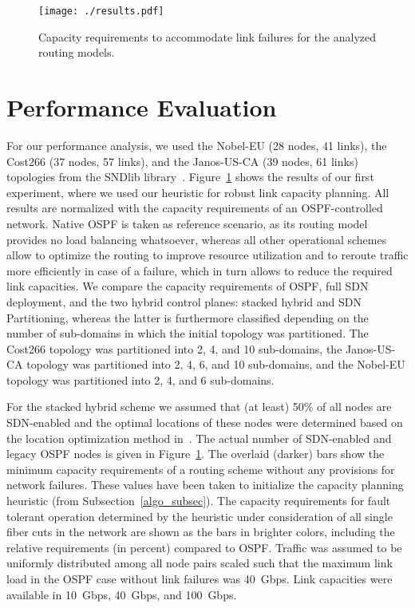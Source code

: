 \documentclass[10pt, conference]{IEEEtran}
\begin{document}
\begin{figure}[t] \center
\texttt{[image: ./results.pdf]}
\caption{Capacity requirements to accommodate link failures for the analyzed routing models.}
\label{result1} \end{figure}


\section{Performance Evaluation}\label{results-sect}
For our performance analysis, we used the Nobel-EU (28 nodes, 41 links), the Cost266 (37 nodes, 57 links), and the Janos-US-CA (39 nodes, 61 links) topologies from the SNDlib library~\cite{sndlib}. Figure~\ref{result1} shows the results of our first experiment, where we used our heuristic for robust link capacity planning. All results are normalized with the capacity requirements of an OSPF-controlled network. Native OSPF is taken as reference scenario, as its routing model provides no load balancing whatsoever, whereas all other operational schemes allow to optimize the routing to improve resource utilization and to reroute traffic more efficiently in case of a failure, which in turn allows to reduce the required link capacities. We compare the capacity requirements of OSPF, full SDN deployment, and the two hybrid control planes: stacked hybrid and SDN Partitioning, whereas the latter is furthermore classified depending on the number of sub-domains in which the initial topology was partitioned. The Cost266 topology was partitioned into 2, 4, and 10 sub-domains, the Janos-US-CA topology was partitioned into 2, 4, 6, and 10 sub-domains, and the Nobel-EU topology was partitioned into 2, 4, and 6 sub-domains.

For the stacked hybrid scheme we assumed that (at least) 50\% of all nodes are SDN-enabled and the optimal locations of these nodes were determined based on the location optimization method in~\cite{hybrid_2}. The actual number of SDN-enabled and legacy OSPF nodes is given in Figure~\ref{result1}. The overlaid (darker) bars show the minimum capacity requirements of a routing scheme without any provisions for network failures. These values have been taken to initialize the capacity planning heuristic (from Subsection~\ref{algo_subsec}). The capacity requirements for fault tolerant operation determined by the heuristic under consideration of all single fiber cuts in the network are shown as the bars in brighter colors, including the relative requirements (in percent) compared to OSPF. Traffic was assumed to be uniformly distributed among all node pairs scaled such that the maximum link load in the OSPF case without link failures was 40~Gbps. Link capacities were available in 10~Gbps, 40~Gbps, and 100~Gbps.
\end{document}
